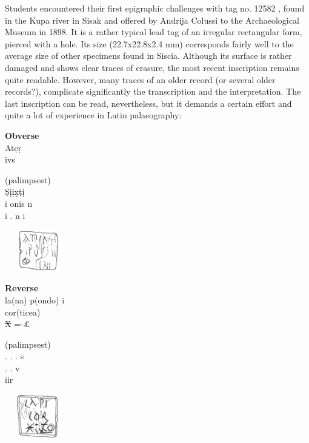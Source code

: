 \documentclass[amsthm,ebook]{saparticle}
\begin{document}
Students encountered their first epigraphic challenges with tag no. 12582 \citep[cat 03.13, 347]{radman-livaja_plombs_2014}, found in
the Kupa river in Sisak and offered by Andrija Colussi to the Archaeological Museum in 1898. It is a rather typical
lead tag of an irregular rectangular form, pierced with a hole. Its size (22.7x22.8x2.4 mm) corresponds fairly well to
the average size of other specimens found in Siscia. Although its surface is rather damaged and shows clear traces of
erasure, the most recent inscription remains quite readable. However, many traces of an older record (or several older
records?), complicate significantly the transcription and the interpretation. The last inscription can be read,
nevertheless, but it demands a certain effort and quite a lot of experience in Latin palaeography:

\begin{minipage}[t]{0.25\textwidth}
\textbf{Obverse}\\
At\d{e}\d{r}\\
ivs
\end{minipage}
\begin{minipage}[t]{0.25\textwidth}
(palimpsest)\\
\d{S}\d{i}\d{i}\d{x}\d{t}\d{i}\\
i onis n\\
i . n i 
\end{minipage}
\begin{minipage}[c]{0.30\textwidth}
\includegraphics[width=2.965cm,height=1.79cm]{EAGLE16lameetalteaching-img005a.png}
\end{minipage}

\begin{minipage}[t]{0.25\textwidth}
\textbf{Reverse}\\
la(na) p(ondo) i\\
cor(ticea)\\
\sout{X} =-\pounds\\
\end{minipage}
\begin{minipage}[t]{0.25\textwidth}
(palimpsest)\\
. . . s\\
. . v\\
  iir 
\end{minipage}
\begin{minipage}[c]{0.30\textwidth}
\includegraphics[width=2.845cm,height=1.896cm]{EAGLE16lameetalteaching-img005b.png}
\end{minipage}
\end{document}
